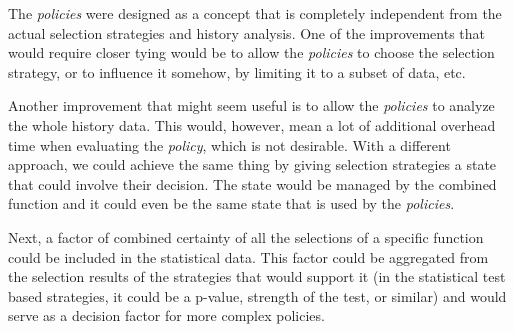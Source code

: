 The \textit{policies} were designed as a concept that is completely independent from the actual selection strategies and history analysis. One of the improvements that would require closer tying would be to allow the \textit{policies} to choose the selection strategy, or to influence it somehow, by limiting it to a subset of data, etc. 

Another improvement that might seem useful is to allow the \textit{policies} to analyze the whole history data. This would, however, mean a lot of additional overhead time when evaluating the \textit{policy}, which is not desirable.
With a different approach, we could achieve the same thing by giving selection strategies a state that could involve their decision. The state would be managed by the combined function and it could even be the same state that is used by the \textit{policies}. 

Next, a factor of combined certainty of all the selections of a specific function could be included in the statistical data. This factor could be aggregated from the selection results of the strategies that would support it (in the statistical test based strategies, it could be a p-value, strength of the test, or similar) and would serve as a decision factor for more complex policies.

